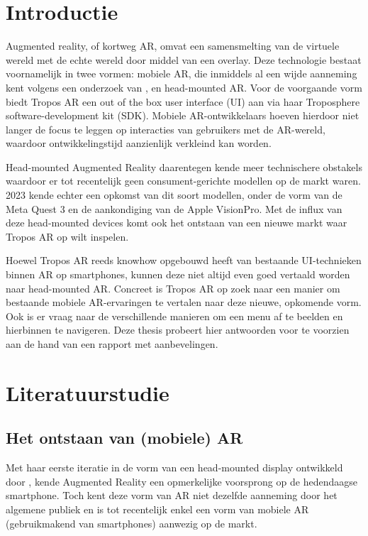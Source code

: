 
\section{Introductie}%
\label{sec:introductie}

Augmented reality, of kortweg AR, omvat een samensmelting van de virtuele wereld met de echte wereld door middel van een overlay.
Deze technologie bestaat voornamelijk in twee vormen: mobiele AR, die inmiddels al een wijde aanneming kent volgens een onderzoek van \textcite{Berggren2023}, en head-mounted AR.
Voor de voorgaande vorm biedt Tropos AR een out of the box user interface (UI) aan via haar Troposphere software-development kit (SDK).
Mobiele AR-ontwikkelaars hoeven hierdoor niet langer de focus te leggen op interacties van gebruikers met de AR-wereld, waardoor ontwikkelingstijd aanzienlijk verkleind kan worden.

Head-mounted Augmented Reality daarentegen kende meer technischere obstakels waardoor er tot recentelijk geen consument-gerichte modellen op de markt waren.
2023 kende echter een opkomst van dit soort modellen, onder de vorm van de Meta Quest 3 en de aankondiging van de Apple VisionPro.
Met de influx van deze head-mounted devices komt ook het ontstaan van een nieuwe markt waar Tropos AR op wilt inspelen.

Hoewel Tropos AR reeds knowhow opgebouwd heeft van bestaande UI-technieken binnen AR op smartphones, kunnen deze niet altijd even goed vertaald worden naar head-mounted AR.
Concreet is Tropos AR op zoek naar een manier om bestaande mobiele AR-ervaringen te vertalen naar deze nieuwe, opkomende vorm.
Ook is er vraag naar de verschillende manieren om een menu af te beelden en hierbinnen te navigeren.
Deze thesis probeert hier antwoorden voor te voorzien aan de hand van een rapport met aanbevelingen.


\section{Literatuurstudie}%
\label{sec:state-of-the-art}

\subsection{Het ontstaan van (mobiele) AR}
\label{subsec:wat-is-ar}
Met haar eerste iteratie in de vorm van een head-mounted display ontwikkeld door \textcite{Sutherland1968} , kende Augmented Reality een opmerkelijke voorsprong op de hedendaagse smartphone.
Toch kent deze vorm van AR niet dezelfde aanneming door het algemene publiek en is tot recentelijk enkel een vorm van mobiele AR (gebruikmakend van smartphones) aanwezig op de markt.


